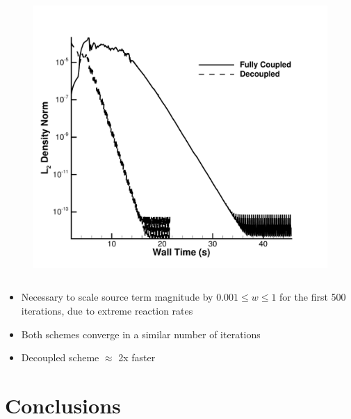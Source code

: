 \documentclass{beamer}
\begin{document}
\begin{frame}
\begin{columns}[t]
\begin{column}{0.5\textwidth}
\begin{figure}[h!]
	  \includegraphics[width=\textwidth]{figures/cone_walltime}
        \end{figure}
      \end{column}
    \end{columns}
  \begin{itemize}
    \item Necessary to scale source term magnitude by $0.001 \leq w \leq 1$ 
      for the first 500 iterations, due to extreme reaction rates
    \item Both schemes converge in a similar number of iterations
    \item Decoupled scheme $\approx$ 2x faster
  \end{itemize}
\end{frame}

\section{Conclusions}
\end{document}
